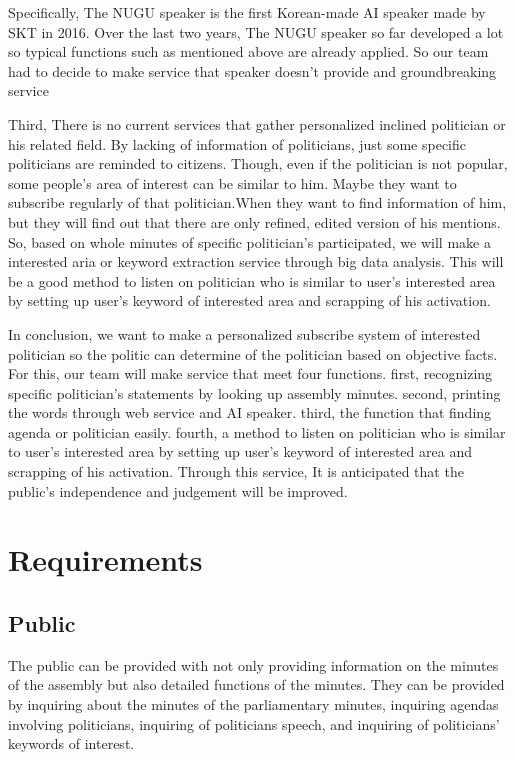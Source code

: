 \documentclass[conference]{IEEEtran}
\begin{document}
Specifically, The NUGU speaker is the first Korean-made AI speaker made by SKT in 2016. Over the last two years, The NUGU speaker so far developed a lot so typical functions such as mentioned above are already applied. So our team had to decide to make service that speaker doesn’t provide and groundbreaking service

Third, There is no current services that gather personalized inclined politician or his related field. By lacking of information of politicians, just some specific politicians are reminded to citizens. Though, even if the politician is not popular, some people’s area of interest can be similar to him. Maybe they want to subscribe regularly of that politician.When they want to find information of him, but they will find out that there are only refined, edited version of his mentions. So, based on whole minutes of specific politician’s participated, we will make a interested aria or keyword extraction service through big data analysis. This will be a good method to listen on politician who is similar to user’s interested area by setting up user’s keyword of interested area and scrapping of his activation.

In conclusion, we want to make a  personalized subscribe system of interested politician so the politic can determine of the politician based on objective facts. For this, our team will make service that meet four functions. first, recognizing specific politician’s statements by looking up assembly minutes. second, printing the words through web service and AI speaker. third, the function that finding agenda or politician easily. fourth, a method to listen on politician who is similar to user’s interested area by setting up user’s keyword of interested area and scrapping of his activation. Through this service, It is anticipated that the public’s independence and judgement will be improved.


\section{Requirements}
\subsection{Public}
The public can be provided with  not only providing information on the minutes of the assembly but also detailed functions of the minutes. They can be provided by inquiring about the minutes of the parliamentary minutes, inquiring agendas involving politicians, inquiring of politicians speech, and inquiring of politicians' keywords of interest.\\ 
\end{document}

